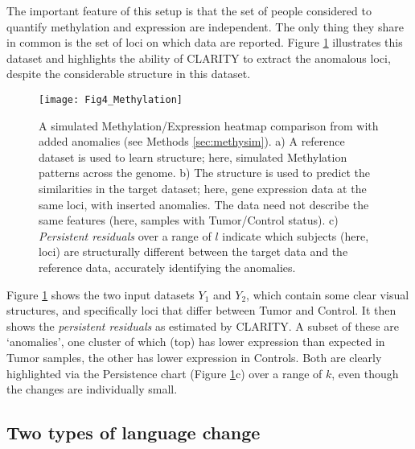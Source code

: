 \documentclass[a4]{article}
\newcommand{\+}[1]{\mathbf{#1}}
\begin{document}
The important feature of this setup is that the set of people considered to quantify methylation and expression are independent. The only thing they share in common is the set of loci on which data are reported. Figure \ref{fig:methy} illustrates this dataset and highlights the ability of CLARITY to extract the anomalous loci, despite the considerable structure in this dataset.

\begin{figure}[htb]
\begin{center}
  \centerline{\texttt{[image: Fig4\_Methylation]}}
  \caption{
    A simulated Methylation/Expression heatmap comparison from \cite{gu2016complex} with added anomalies (see Methods \ref{sec:methysim}).
   a) A reference dataset is used to learn structure; here, simulated Methylation patterns across the genome.
   b) The structure is used to predict the similarities in the target dataset; here, gene expression data at the same loci, with inserted anomalies. The data need not describe the same features (here, samples with Tumor/Control status).
   c) \emph{Persistent residuals} over a range of $l$ indicate which subjects (here, loci) are structurally different between the target data and the reference data, accurately identifying the anomalies.
  }
  \label{fig:methy}
\end{center}
\end{figure}


Figure \ref{fig:methy} shows the two input datasets $Y_1$ and $Y_2$, which contain some clear visual structures, and specifically loci that differ between Tumor and Control. It then shows the \emph{persistent residuals} as estimated by CLARITY. A subset of these are `anomalies', one cluster of which (top) has lower expression than expected in Tumor samples, the other has lower expression in Controls. Both are clearly highlighted via the Persistence chart (Figure \ref{fig:methy}c) over a range of $k$, even though the changes are individually small.

\subsection{Two types of language change}
\label{sec:languagechange}
\end{document}
